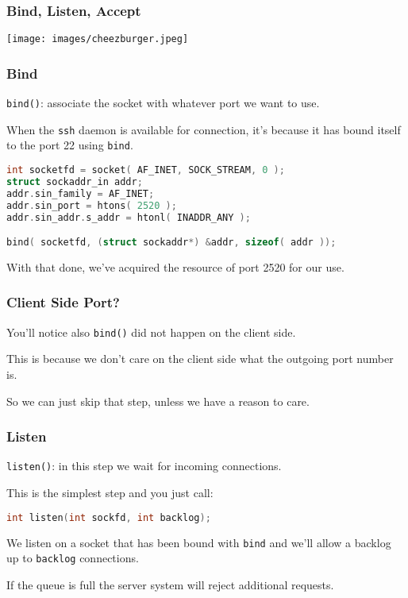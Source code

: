\begin{frame}
	\frametitle{Bind, Listen, Accept}

	\begin{center}
		\texttt{[image: images/cheezburger.jpeg]}
	\end{center}

\end{frame}


\begin{frame}[fragile]
	\frametitle{Bind}

	\texttt{bind()}: associate the socket with whatever port we want to use.

	When the \texttt{ssh} daemon is available for connection, it's because it has bound itself to the port 22 using \texttt{bind}.

	\begin{lstlisting}[language=C]
int socketfd = socket( AF_INET, SOCK_STREAM, 0 );
struct sockaddr_in addr;
addr.sin_family = AF_INET;
addr.sin_port = htons( 2520 );
addr.sin_addr.s_addr = htonl( INADDR_ANY );

bind( socketfd, (struct sockaddr*) &addr, sizeof( addr ));
\end{lstlisting}

	With that done, we've acquired the resource of port 2520 for our use.

\end{frame}


\begin{frame}
	\frametitle{Client Side Port?}

	You'll notice also \texttt{bind()} did not happen on the client side.

	This is because we don't care on the client side what the outgoing port number is.

	So we can just skip that step, unless we have a reason to care.

\end{frame}


\begin{frame}[fragile]
	\frametitle{Listen}

	\texttt{listen()}: in this step we wait for incoming connections.

	This is the simplest step and you just call:

	\begin{lstlisting}[language=C]
int listen(int sockfd, int backlog); 
\end{lstlisting}

	We listen on a socket that has been bound with \texttt{bind} and we'll allow a backlog up to \texttt{backlog} connections.

	If the queue is full the server system will reject additional requests.


\end{frame}


